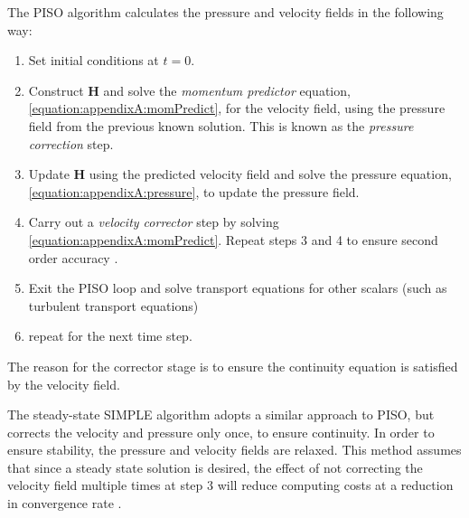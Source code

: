 \documentclass[12pt,oneside,a4paper]{article}
\newcommand{\vect}[1]{\boldsymbol{#1}}
\begin{document}
The PISO algorithm \citep{issa1986} calculates the pressure and velocity fields in the following way:
\begin{enumerate}
\item Set initial conditions at $t=0$.
\item Construct $\vect{H}$ and solve the \textit{momentum predictor} equation, \eqref{equation:appendixA:momPredict}, for the velocity field, using the pressure field from the previous known solution. This is known as the \textit{pressure correction} step.
\item Update $\vect{H}$ using the predicted velocity field and solve the pressure equation, \eqref{equation:appendixA:pressure}, to update the pressure field. 
\item Carry out a \textit{velocity corrector} step by solving \eqref{equation:appendixA:momPredict}. Repeat steps 3 and 4 to ensure second order accuracy \citep{issa1986}.
\item Exit the PISO loop and solve transport equations for other scalars (such as turbulent transport equations)
\item repeat for the next time step. 
\end{enumerate}
The reason for the corrector stage is to ensure the continuity equation is satisfied by the velocity field.

The steady-state SIMPLE algorithm \citep{caretto1973} adopts a similar approach to PISO, but corrects the velocity and pressure only once, to ensure continuity. In order to ensure stability, the pressure and velocity fields are relaxed. This method assumes that since a steady state solution is desired, the effect of not correcting the velocity field multiple times at step 3 will reduce computing costs at a reduction in convergence rate \citep{ferziger1997}.

\newpage
\end{document}
